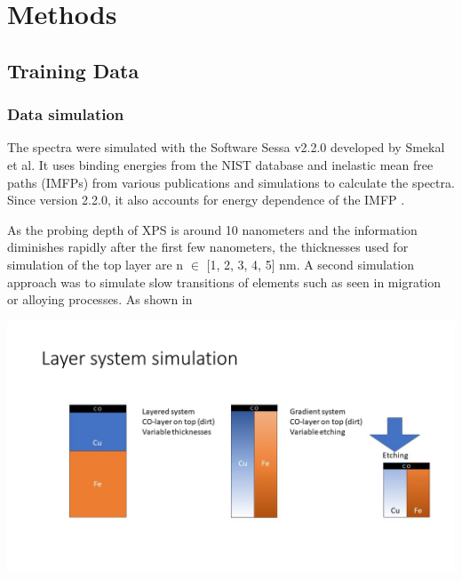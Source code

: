 


\chapter{Methods} %

\label{Chapter3} %


\section{Training Data}



\subsection{Data simulation}

The spectra were simulated with the Software Sessa v2.2.0 developed by Smekal et al. It uses binding energies from the NIST database and inelastic mean free paths (IMFPs) from various publications and simulations to calculate the spectra. Since version 2.2.0, it also accounts for energy dependence of the IMFP \cite{noauthor_nist_2010}.

As the probing depth of XPS is around 10 nanometers and the information diminishes rapidly after the first few nanometers, the thicknesses used for simulation of the top layer are n $\in$ [1, 2, 3, 4, 5] nm. A second simulation approach was to simulate slow transitions of elements such as seen in migration or alloying processes. As shown in 

\includegraphics[]{figures/Layers.jpg}

